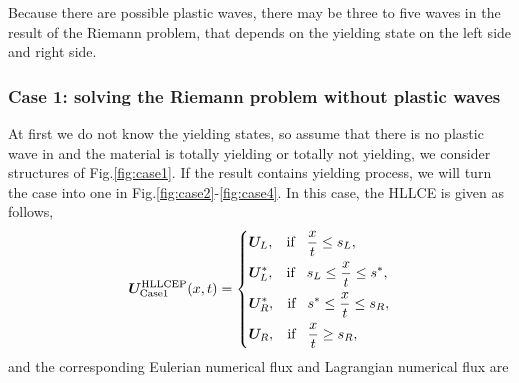 \documentclass{article}
\numberwithin{equation}{section}
\numberwithin{table}{section}
\begin{document}

Because there are possible plastic waves, there may be three  to five waves in the result of the Riemann problem, that  depends on the  yielding state  on the left side and right side.

\subsubsection{Case 1: solving the Riemann problem without  plastic waves}\label{sec:case1}
At first we do not know the yielding states, so assume that there is no plastic wave in  and the material is totally yielding or totally not yielding, we consider structures of Fig.\ref{fig:case1}. If the result contains yielding process, we will turn the case into one in Fig.\ref{fig:case2}-\ref{fig:case4}.
%
In this case, the HLLCE is given as follows,
\begin{equation}\label{eq:HLLCEP}
  \bm{U}^{\text{HLLCEP}}_{\text{Case1}}(x,t) = \left\{ \begin{aligned}
		& \bm{U}_L, \hspace{0.3cm} \text{if} \hspace{0.3cm} \frac{x}{t}\le s_L, \\
		& \bm{U}_L^*, \hspace{0.3cm} \text{if} \hspace{0.3cm} s_L\le \frac{x}{t} \le s^*, \\
		& \bm{U}_R^*, \hspace{0.3cm} \text{if} \hspace{0.3cm} s^*\le \frac{x}{t} \le s_R,\\
		& \bm{U}_R, \hspace{0.3cm} \text{if} \hspace{0.3cm} \frac{x}{t}\ge s_R, \\
	  \end{aligned}
	\right.
  \end{equation}
  and the corresponding Eulerian numerical flux and Lagrangian numerical flux are
\end{document}
